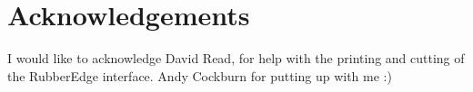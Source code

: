 \section{Acknowledgements}
I would like to acknowledge David Read, for help with the printing and cutting of the RubberEdge interface.
Andy Cockburn for putting up with me :)